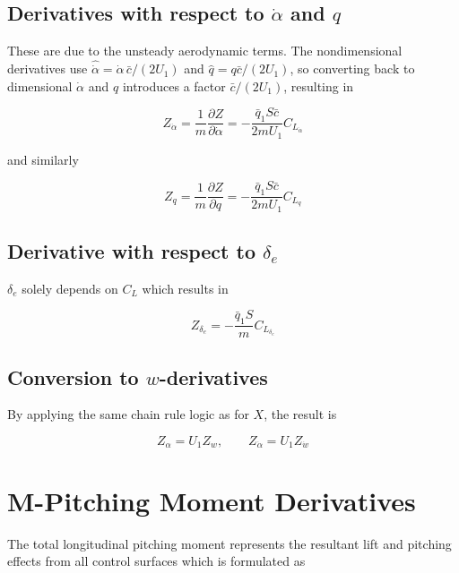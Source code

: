 \documentclass[11pt]{article}
\newcommand{\qbar}{\bar{q}}
\newcommand{\cbar}{\bar{c}}
\newcommand{\dd}[2]{\dfrac{\partial #1}{\partial #2}}
\begin{document}
\subsection{Derivatives with respect to $\dot\alpha$ and $q$}

These are due to the unsteady aerodynamic terms.
The nondimensional derivatives use $\hat{\dot\alpha} = \dot\alpha\,\cbar/(2U_1)$ and $\hat q = q\cbar/(2U_1)$, so
converting back to dimensional $\dot\alpha$ and $q$ introduces a factor $\cbar/(2U_1)$, resulting in

\begin{equation}\label{eq:equation_16}
\boxed{\;Z_{\dot\alpha} = \frac{1}{m}\dd{Z}{\dot\alpha}
       = -\frac{\qbar_1 S\cbar}{2mU_1}C_{L_{\dot\alpha}}\;}
\end{equation}

and similarly

\begin{equation}\label{eq:equation_17}
\boxed{\;Z_q = \frac{1}{m}\dd{Z}{q}
       = -\frac{\qbar_1 S\cbar}{2mU_1}C_{L_q}\;}
\end{equation}

\subsection{Derivative with respect to $\delta_e$}

$\delta_{e}$ solely depends on $C_L$ which results in

\begin{equation}\label{eq:equation_18}
\boxed{\;Z_{\delta_e} = -\frac{\qbar_1 S}{m}C_{L_{\delta_e}}\;}
\end{equation}

\subsection{Conversion to $w$-derivatives}

By applying the same chain rule logic as for $X$, the result is

\begin{equation}\label{eq:equation_19}
\boxed{\;Z_\alpha = U_1 Z_w, \qquad Z_{\dot\alpha} = U_1 Z_{\dot w}\;}
\end{equation}

\section{M-Pitching Moment Derivatives}

The total longitudinal pitching moment represents the resultant lift and pitching effects from all control surfaces
which is formulated as
\end{document}
